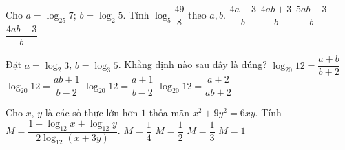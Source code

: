 \begin{ex}%
	Cho $a = \log_{25}7$; $b = \log_2 5$. Tính $\log_{5}\dfrac{49}{8}$ theo  $a, b$.
	 \choice
		 {$\dfrac{4a-3}{b}$}
		{$\dfrac{4ab+3}{b}$} 
		{$\dfrac{5ab-3}{b}$} 
		{\True  $\dfrac{4ab-3}{b}$}
\end{ex}

\begin{ex}%
	Đặt $a=\log_2 3$, $b=\log_3 5$. Khẳng định  nào sau đây là đúng?
	\choice 
		{  $\log_{20} 12 =\dfrac{a+b}{b+2}$ }
		{ $\log_{20} 12  =\dfrac{ab+1}{b-2}$ }
		 { $\log_{20} 12 =\dfrac{a+1}{b-2}$ }
		{ \True $\log_{20} 12  =\dfrac{a+2}{ab+2}$ }
\end{ex}

\begin{ex}%
	Cho $x$, $y$ là các số thực lớn hơn $1$ thỏa mãn $x^{2}+9y^{2}=6xy$. Tính $M=\dfrac{1+\log_{12}x+\log_{12}y}{2\log_{12}\left(x+3y\right)}$. 
	\choice 
		{$M=\dfrac{1}{4}$} 
		 {$M=\dfrac{1}{2}$}
		{$M=\dfrac{1}{3}$} 
		{\True  $M=1$}
\end{ex}

